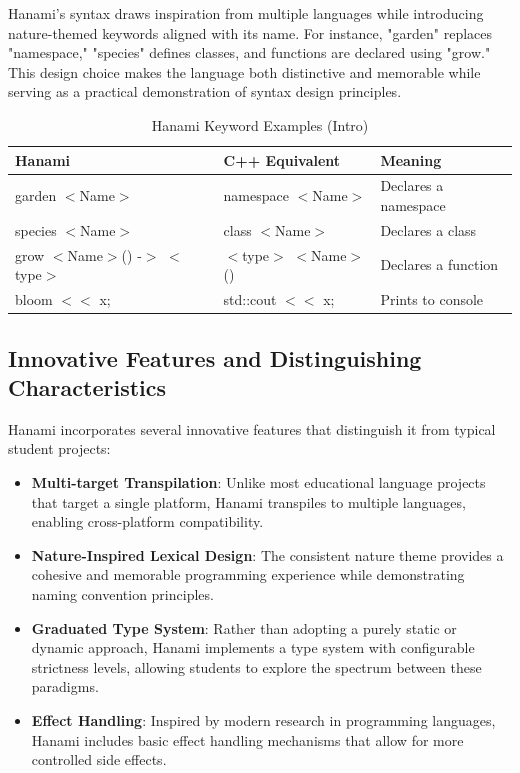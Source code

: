 \documentclass[conference]{IEEEtran}
\begin{document}
Hanami's syntax draws inspiration from multiple languages while introducing nature-themed keywords aligned with its name. For instance, "garden" replaces "namespace," "species" defines classes, and functions are declared using "grow." This design choice makes the language both distinctive and memorable while serving as a practical demonstration of syntax design principles.

\begin{table}[tbp] %
    \caption{Hanami Keyword Examples (Intro)}
    \label{table:keywords_intro}
    \centering
    \begin{tabular}{@{}lll@{}} %
        \toprule
        \textbf{Hanami} & \textbf{C++ Equivalent} & \textbf{Meaning} \\
        \midrule
        garden $<$Name$>$ & namespace $<$Name$>$ & Declares a namespace \\
        species $<$Name$>$ & class $<$Name$>$ & Declares a class \\
        grow $<$Name$>$() -$>$ $<$type$>$ & $<$type$>$ $<$Name$>$() & Declares a function \\
        bloom $<<$ x; & std::cout $<<$ x; & Prints to console \\
        \bottomrule
    \end{tabular}
\end{table}

\subsection{Innovative Features and Distinguishing Characteristics}

Hanami incorporates several innovative features that distinguish it from typical student projects:

\begin{itemize}
    \item \textbf{Multi-target Transpilation}: Unlike most educational language projects that target a single platform, Hanami transpiles to multiple languages, enabling cross-platform compatibility.
    \item \textbf{Nature-Inspired Lexical Design}: The consistent nature theme provides a cohesive and memorable programming experience while demonstrating naming convention principles.
    \item \textbf{Graduated Type System}: Rather than adopting a purely static or dynamic approach, Hanami implements a type system with configurable strictness levels, allowing students to explore the spectrum between these paradigms.
    \item \textbf{Effect Handling}: Inspired by modern research in programming languages, Hanami includes basic effect handling mechanisms that allow for more controlled side effects.
\end{itemize}
\end{document}
